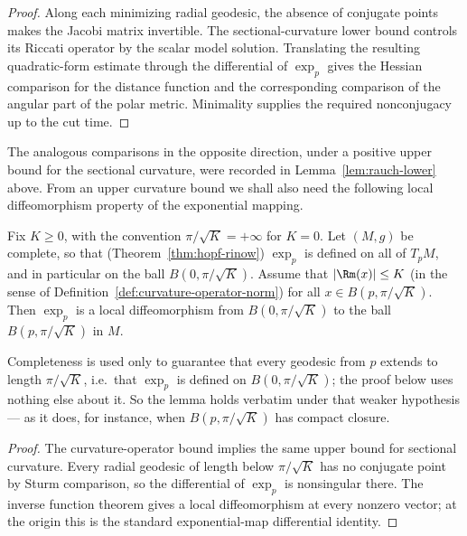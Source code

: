 \begin{proof}
\sketch
{}
Along each minimizing radial geodesic, the absence of conjugate points makes the Jacobi matrix invertible. The sectional-curvature lower bound controls its Riccati operator by the scalar model solution. Translating the resulting quadratic-form estimate through the differential of $\exp_p$ gives the Hessian comparison for the distance function and the corresponding comparison of the angular part of the polar metric. Minimality supplies the required nonconjugacy up to the cut time.
\end{proof}

The analogous comparisons in the opposite direction, under a
positive upper bound for the sectional curvature, were recorded in
Lemma~\ref{lem:rauch-lower} above. From an upper curvature bound we
shall also need the following local diffeomorphism property of the
exponential mapping.



\begin{lemma}
\label{lem:local-diffeomorphism-bounded-curvature}
\leanok
\label{localdiffeo}



Fix $K\ge 0$, with the convention $\pi/\sqrt K=+\infty$ for $K=0$.
Let $(M,g)$ be complete, so that (Theorem~\ref{thm:hopf-rinow})
$\exp_p$ is defined on all of $T_pM$, and in particular on the ball
$B(0,\pi/\sqrt{K})$. Assume that $|\Rm(x)|\le K$ (in the sense of
Definition~\ref{def:curvature-operator-norm}) for all $x\in
B(p,\pi/\sqrt{K})$. Then
$\exp_p$ is a local diffeomorphism from $B(0,\pi/\sqrt{K})$ to
the  ball $B(p,\pi/\sqrt{K})$ in
$M$.
\end{lemma}

Completeness is used only to guarantee that every geodesic from $p$
extends to length $\pi/\sqrt K$, i.e.\ that $\exp_p$ is defined on
$B(0,\pi/\sqrt K)$; the proof below uses nothing else about it. So
the lemma holds verbatim under that weaker hypothesis --- as it does,
for instance, when $B(p,\pi/\sqrt K)$ has compact closure.

\begin{proof}
\sketch
{}
The curvature-operator bound implies the same upper bound for sectional curvature. Every radial geodesic of length below $\pi/\sqrt K$ has no conjugate point by Sturm comparison, so the differential of $\exp_p$ is nonsingular there. The inverse function theorem gives a local diffeomorphism at every nonzero vector; at the origin this is the standard exponential-map differential identity.
\end{proof}


